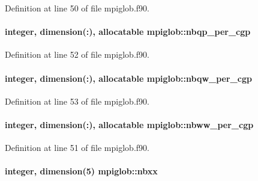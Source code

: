Definition at line 50 of file mpiglob.\-f90.

\hypertarget{classmpiglob_a99445120c004f76c2b6eecd9684b21a2}{
\paragraph[{nbqp\-\_\-per\-\_\-cgp}]{\setlength{\rightskip}{0pt plus 5cm}integer, dimension(\-:), allocatable mpiglob\-::nbqp\-\_\-per\-\_\-cgp}}\label{classmpiglob_a99445120c004f76c2b6eecd9684b21a2}


Definition at line 52 of file mpiglob.\-f90.

\hypertarget{classmpiglob_a1993ff2eb88b6f49ea254628e399f390}{
\paragraph[{nbqw\-\_\-per\-\_\-cgp}]{\setlength{\rightskip}{0pt plus 5cm}integer, dimension(\-:), allocatable mpiglob\-::nbqw\-\_\-per\-\_\-cgp}}\label{classmpiglob_a1993ff2eb88b6f49ea254628e399f390}


Definition at line 53 of file mpiglob.\-f90.

\hypertarget{classmpiglob_a8d9f2a5c2cd3bedd69003d3a215c235d}{
\paragraph[{nbww\-\_\-per\-\_\-cgp}]{\setlength{\rightskip}{0pt plus 5cm}integer, dimension(\-:), allocatable mpiglob\-::nbww\-\_\-per\-\_\-cgp}}\label{classmpiglob_a8d9f2a5c2cd3bedd69003d3a215c235d}


Definition at line 51 of file mpiglob.\-f90.

\hypertarget{classmpiglob_af984afea8888f7db0e067cf37c534173}{
\paragraph[{nbxx}]{\setlength{\rightskip}{0pt plus 5cm}integer, dimension(5) mpiglob\-::nbxx}}\label{classmpiglob_af984afea8888f7db0e067cf37c534173}



